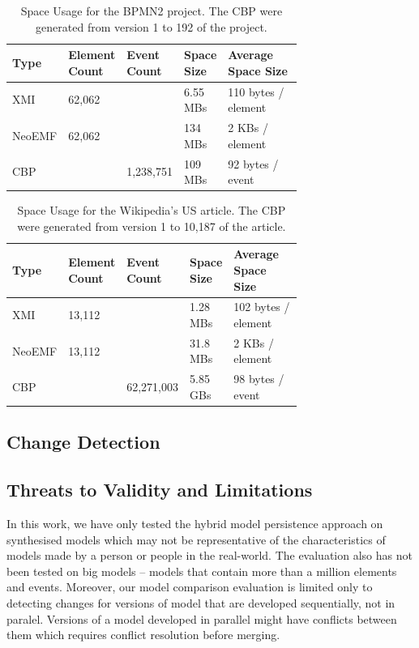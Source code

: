 \documentclass[10pt,conference]{IEEEtran}
\begin{document}
\begin{table} [ht]
    \centering
    \caption{Space Usage for the BPMN2 project. The CBP were generated from version 1 to 192 of the project.}
    \label{table:space_usage_bpmn2}
    \begin{tabular}{ p{0.1\linewidth} p{0.1\linewidth} p{0.12\linewidth} p{0.13\linewidth} p{0.26\linewidth} }
        \hline 
        \textbf{Type} & \textbf{Element Count} & \textbf{Event Count} & \textbf{Space Size} & \textbf{Average Space Size} \\
        \hline 
        XMI & 62,062 &  & 6.55 MBs & 110 bytes / element  \\
        NeoEMF & 62,062 &  & 134 MBs & 2 KBs / element \\
        CBP &  & 1,238,751 & 109 MBs &  92 bytes / event \\
        \hline 
    \end{tabular}
\end{table}

\begin{table} [ht]
    \centering
    \caption{Space Usage for the Wikipedia's US article. The CBP were generated from version 1 to 10,187 of the article.}
    \label{table:space_usage_wikipedia}
    \begin{tabular}{ p{0.1\linewidth} p{0.1\linewidth} p{0.12\linewidth} p{0.13\linewidth} p{0.26\linewidth} }
        \hline 
        \textbf{Type} & \textbf{Element Count} & \textbf{Event Count} & \textbf{Space Size} & \textbf{Average Space Size} \\
        \hline 
        XMI & 13,112 &  & 1.28 MBs & 102 bytes / element  \\
        NeoEMF & 13,112 &  & 31.8 MBs & 2 KBs / element \\
        CBP &  & 62,271,003 & 5.85 GBs &  98 bytes / event \\
        \hline 
    \end{tabular}
\end{table}

\subsection{Change Detection}
\label{sec:change_detection}


\subsection{Threats to Validity and Limitations}
\label{sec:threats_to_validity_and_limitations}
In this work, we have only tested the hybrid model persistence approach on synthesised models which may not be representative of the characteristics of models made by a person or people in the real-world. The evaluation also has not been tested on big models -- models that contain more than a million elements and events. Moreover, our model comparison evaluation is limited only to detecting changes for versions of model that are developed sequentially, not in paralel. Versions of a model developed in parallel might have conflicts between them which requires conflict resolution before merging.
\end{document}
